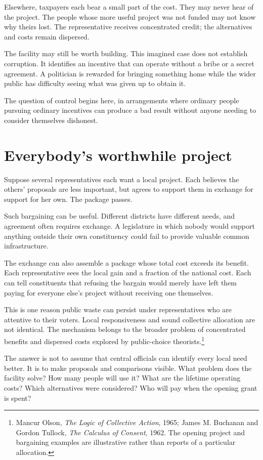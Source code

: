 \documentclass[12pt,a4paper]{book}
\begin{document}
Elsewhere, taxpayers each bear a small part of the cost. They may never hear of the project. The people whose more useful project was not funded may not know why theirs lost. The representative receives concentrated credit; the alternatives and costs remain dispersed.

The facility may still be worth building. This imagined case does not establish corruption. It identifies an incentive that can operate without a bribe or a secret agreement. A politician is rewarded for bringing something home while the wider public has difficulty seeing what was given up to obtain it.

The question of control begins here, in arrangements where ordinary people pursuing ordinary incentives can produce a bad result without anyone needing to consider themselves dishonest.

\section*{Everybody's worthwhile project}

Suppose several representatives each want a local project. Each believes the others' proposals are less important, but agrees to support them in exchange for support for her own. The package passes.

Such bargaining can be useful. Different districts have different needs, and agreement often requires exchange. A legislature in which nobody would support anything outside their own constituency could fail to provide valuable common infrastructure.

The exchange can also assemble a package whose total cost exceeds its benefit. Each representative sees the local gain and a fraction of the national cost. Each can tell constituents that refusing the bargain would merely have left them paying for everyone else's project without receiving one themselves.

This is one reason public waste can persist under representatives who are attentive to their voters. Local responsiveness and sound collective allocation are not identical. The mechanism belongs to the broader problem of concentrated benefits and dispersed costs explored by public-choice theorists.\footnote{Mancur Olson, \emph{The Logic of Collective Action}, 1965; James M. Buchanan and Gordon Tullock, \emph{The Calculus of Consent}, 1962. The opening project and bargaining examples are illustrative rather than reports of a particular allocation.}

The answer is not to assume that central officials can identify every local need better. It is to make proposals and comparisons visible. What problem does the facility solve? How many people will use it? What are the lifetime operating costs? Which alternatives were considered? Who will pay when the opening grant is spent?
\end{document}
